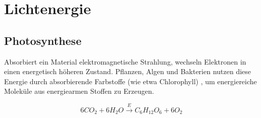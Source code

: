 \section{Lichtenergie}
\subsection{Photosynthese}
Absorbiert ein Material elektromagnetische Strahlung, wechseln Elektronen in einen energetisch höheren Zustand. Pflanzen, Algen und Bakterien nutzen diese Energie durch absorbierende Farbstoffe (wie etwa Chlorophyll) , um energiereiche Moleküle aus energiearmen Stoffen zu Erzeugen.



$$6CO_2 + 6H_2O \xrightarrow{E} C_6H_{12}O_6 + 6O_2$$